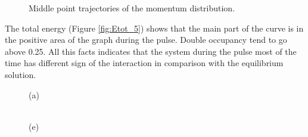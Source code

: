 \begin{figure}[h!]
\begin{minipage}[h]{0.5\linewidth}
\end{minipage}
\caption{Middle point trajectories of the momentum distribution.}
\label{fig:Pulse_p_5}
\end{figure}

The total energy (Figure \ref{fig:Etot_5}) shows that the main part of the curve is in the positive area of the graph during the pulse. Double occupancy tend to go above 0.25. All this facts indicates that the system during the pulse most of the time has different sign of the interaction in comparison with the equilibrium solution.

\clearpage

\begin{figure}[h!]

\begin{minipage}[h]{0.5\linewidth}
 (a) \\
\end{minipage}
\hfill
\begin{minipage}[h]{0.5\linewidth}
 \\(e)
\end{minipage}


\end{figure}
